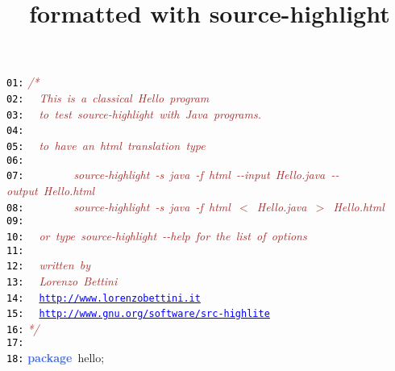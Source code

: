 \documentclass{article}
\title{formatted with source-highlight}
\date{}
\begin{document}
\maketitle
\noindent
\mbox{}\texttt{\textcolor{Black}{01:}} \textit{\textcolor{Brown}{/*}} \\
\mbox{}\texttt{\textcolor{Black}{02:}} \textit{\textcolor{Brown}{\ \ This\ is\ a\ classical\ Hello\ program}} \\
\mbox{}\texttt{\textcolor{Black}{03:}} \textit{\textcolor{Brown}{\ \ to\ test\ source-highlight\ with\ Java\ programs.}} \\
\mbox{}\texttt{\textcolor{Black}{04:}} \textit{\textcolor{Brown}{\ \ }} \\
\mbox{}\texttt{\textcolor{Black}{05:}} \textit{\textcolor{Brown}{\ \ to\ have\ an\ html\ translation\ type}} \\
\mbox{}\texttt{\textcolor{Black}{06:}}  \\
\mbox{}\texttt{\textcolor{Black}{07:}} \textit{\textcolor{Brown}{\ \ \ \ \ \ \ \ source-highlight\ -s\ java\ -f\ html\ -\/-input\ Hello.java\ -\/-output\ Hello.html}} \\
\mbox{}\texttt{\textcolor{Black}{08:}} \textit{\textcolor{Brown}{\ \ \ \ \ \ \ \ source-highlight\ -s\ java\ -f\ html\ $<$\ Hello.java\ $>$\ Hello.html}} \\
\mbox{}\texttt{\textcolor{Black}{09:}}  \\
\mbox{}\texttt{\textcolor{Black}{10:}} \textit{\textcolor{Brown}{\ \ or\ type\ source-highlight\ -\/-help\ for\ the\ list\ of\ options}} \\
\mbox{}\texttt{\textcolor{Black}{11:}}  \\
\mbox{}\texttt{\textcolor{Black}{12:}} \textit{\textcolor{Brown}{\ \ written\ by}} \\
\mbox{}\texttt{\textcolor{Black}{13:}} \textit{\textcolor{Brown}{\ \ Lorenzo\ Bettini}} \\
\mbox{}\texttt{\textcolor{Black}{14:}} \textit{\textcolor{Brown}{\ \ }}\underline{\texttt{\textcolor{Blue}{http://www.lorenzobettini.it}}} \\
\mbox{}\texttt{\textcolor{Black}{15:}} \textit{\textcolor{Brown}{\ \ }}\underline{\texttt{\textcolor{Blue}{http://www.gnu.org/software/src-highlite}}} \\
\mbox{}\texttt{\textcolor{Black}{16:}} \textit{\textcolor{Brown}{*/}} \\
\mbox{}\texttt{\textcolor{Black}{17:}}  \\
\mbox{}\texttt{\textcolor{Black}{18:}} \textbf{\textcolor{RoyalBlue}{package}}\ hello\textcolor{BrickRed}{;} \\
\end{document}
